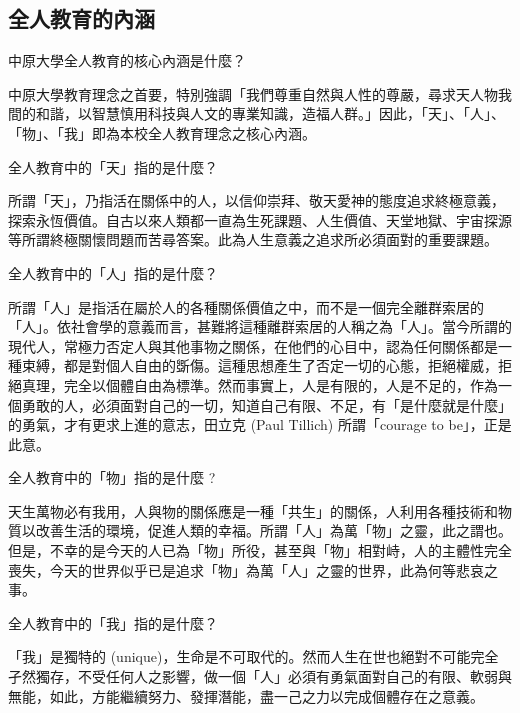 \subsection*{全人教育的內涵}
中原大學全人教育的核心內涵是什麼？ 
\par
中原大學教育理念之首要，特別強調「我們尊重自然與人性的尊嚴，尋求天人物我間的和諧，以智慧慎用科技與人文的專業知識，造福人群。」因此，「天」、「人」、「物」、「我」即為本校全人教育理念之核心內涵。
\par
全人教育中的「天」指的是什麼？ 
\par
所謂「天」，乃指活在關係中的人，以信仰崇拜、敬天愛神的態度追求終極意義，探索永恆價值。自古以來人類都一直為生死課題、人生價值、天堂地獄、宇宙探源等所謂終極關懷問題而苦尋答案。此為人生意義之追求所必須面對的重要課題。 
\par
全人教育中的「人」指的是什麼？ 
\par
所謂「人」是指活在屬於人的各種關係價值之中，而不是一個完全離群索居的「人」。依社會學的意義而言，甚難將這種離群索居的人稱之為「人」。當今所謂的現代人，常極力否定人與其他事物之關係，在他們的心目中，認為任何關係都是一種束縛，都是對個人自由的斲傷。這種思想產生了否定一切的心態，拒絕權威，拒絕真理，完全以個體自由為標準。然而事實上，人是有限的，人是不足的，作為一個勇敢的人，必須面對自己的一切，知道自己有限、不足，有「是什麼就是什麼」的勇氣，才有更求上進的意志，田立克 (Paul Tillich) 所謂「courage to be」，正是此意。 
\par
全人教育中的「物」指的是什麼 ? 
\par
天生萬物必有我用，人與物的關係應是一種「共生」的關係，人利用各種技術和物質以改善生活的環境，促進人類的幸福。所謂「人」為萬「物」之靈，此之謂也。但是，不幸的是今天的人已為「物」所役，甚至與「物」相對峙，人的主體性完全喪失，今天的世界似乎已是追求「物」為萬「人」之靈的世界，此為何等悲哀之事。
\par 
 全人教育中的「我」指的是什麼？
 \par 
「我」是獨特的 (unique)，生命是不可取代的。然而人生在世也絕對不可能完全孑然獨存，不受任何人之影響，做一個「人」必須有勇氣面對自己的有限、軟弱與無能，如此，方能繼續努力、發揮潛能，盡一己之力以完成個體存在之意義。
\clearpage